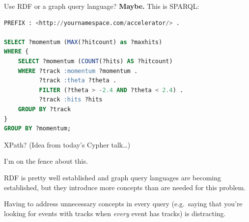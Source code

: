 \documentclass{beamer}
\begin{document}
\begin{frame}[fragile]{Use RDF or a graph query language?}
\vspace{0.25 cm}
{\bf Maybe.} This is SPARQL:

\begin{lstlisting}[language=sql]
PREFIX : <http://yournamespace.com/accelerator/> .

SELECT ?momentum (MAX(?hitcount) as ?maxhits)
WHERE {
    SELECT ?momentum (COUNT(?hits) AS ?hitcount)
    WHERE ?track :momentum ?momentum .
          ?track :theta ?theta .
          FILTER (?theta > -2.4 AND ?theta < 2.4) .
          ?track :hits ?hits
    GROUP BY ?track
}
GROUP BY ?momentum;
\end{lstlisting}

\vspace{0.25 cm}
XPath? (Idea from today's Cypher talk\ldots)

\vspace{0.25 cm}
I'm on the fence about this.

\vspace{0.25 cm}
\begin{minipage}{\linewidth}
\scriptsize
RDF is pretty well established and graph query languages are becoming established, but they introduce more concepts than are needed for this problem.

\vspace{0.25 cm}
Having to address unnecessary concepts in every query (e.g.\ saying that you're looking for events with tracks when {\it every} event has tracks) is distracting.
\end{minipage}
\end{frame}
\end{document}
